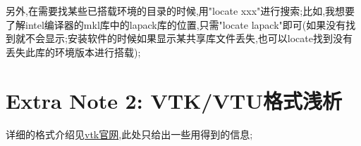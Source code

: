 另外,在需要找某些已搭载环境的目录的时候,用"locate xxx"进行搜索;比如,我想要了解intel编译器的mkl库中的lapack库的位置,只需"locate lapack"即可(如果没有找到就不会显示;安装软件的时候如果显示某共享库文件丢失,也可以locate找到没有丢失此库的环境版本进行搭载);


\section{Extra Note 2: VTK/VTU格式浅析}

详细的格式介绍见\href{https://docs.vtk.org/en/latest/design_documents/VTKFileFormats.html}{vtk官网},此处只给出一些用得到的信息;\par


